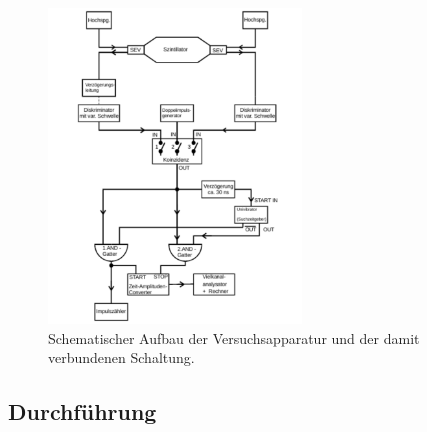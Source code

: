 %
\begin{figure}[htb]
  \centering
  \includegraphics[width=0.6\textwidth]{Aufbau.pdf}
  \caption{Schematischer Aufbau der Versuchsapparatur und der damit verbundenen Schaltung. \cite{V01}}
  \label{fig:aufbau}
\end{figure}
%
\subsection{Durchführung}

